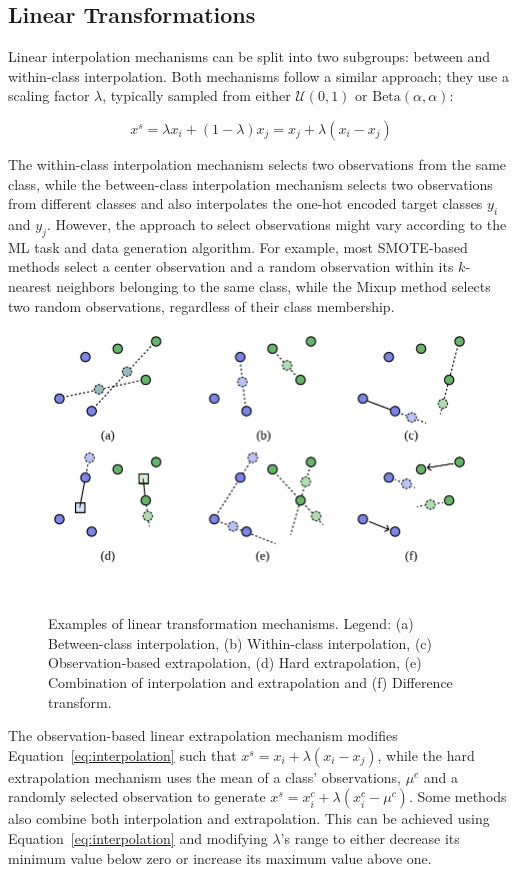 \subsection{Linear Transformations}

Linear interpolation mechanisms can be split into two subgroups: between and
within-class interpolation. Both mechanisms follow a similar approach; they
use a scaling factor $\lambda$, typically sampled from either
$\mathcal{U}(0,1)$ or $\text{Beta}(\alpha, \alpha)$: 

\begin{equation}~\label{eq:interpolation}
    x^s = \lambda x_i + (1-\lambda)x_j = x_j + \lambda(x_i - x_j)
\end{equation}

The within-class interpolation mechanism selects two observations from the
same class, while the between-class interpolation mechanism selects two
observations from different classes and also interpolates the one-hot encoded
target classes $y_i$ and $y_j$. However, the approach to select observations
might vary according to the ML task and data generation algorithm. For
example, most SMOTE-based methods select a center observation and a random
observation within its $k$-nearest neighbors belonging to the same class,
while the Mixup method selects two random observations, regardless of their
class membership.

\begin{figure}
	\centering
	\includegraphics[width=.7\linewidth]{../analysis/linear-transformations}
    \caption{%
        Examples of linear transformation mechanisms. Legend: (a)
        Between-class interpolation, (b) Within-class interpolation, (c)
        Observation-based extrapolation, (d) Hard extrapolation, (e)
        Combination of interpolation and extrapolation and (f) Difference
        transform.
    }~\label{fig:linear-transformations}
\end{figure}

The observation-based linear extrapolation mechanism modifies
Equation~\ref{eq:interpolation} such that $x^s = x_i + \lambda(x_i - x_j)$,
while the hard extrapolation mechanism uses the mean of a class' observations,
$\mu^c$ and a randomly selected observation to generate $x^s = x_i^c +
\lambda(x_i^c - \mu^c)$. Some methods also combine both interpolation and
extrapolation. This can be achieved using Equation~\ref{eq:interpolation} and
modifying $\lambda$'s range to either decrease its minimum value below zero
or increase its maximum value above one.

